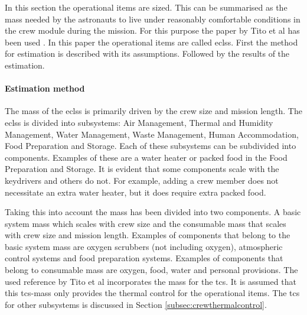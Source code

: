 In this section the operational items are sized. This can be summarised as the mass needed by the astronauts to live under reasonably comfortable conditions in the crew module during the mission. For this purpose the paper by Tito et al has been used \cite{Tito2013}. In this paper the operational items are called \acrfull{eclss}. First the method for estimation is described with its assumptions. Followed by the results of the estimation.

\paragraph{Estimation method}
The mass of the \gls{eclss} is primarily driven by the crew size and mission length. The \gls{eclss} is divided into subsystems: Air Management, Thermal and Humidity Management, Water Management, Waste Management, Human Accommodation, Food Preparation and Storage. Each of these subsystems can be subdivided into components. Examples of these are a water heater or packed food in the Food Preparation and Storage. It is evident that some components scale with the keydrivers and others do not. For example, adding a crew member does not necessitate an extra water heater, but it does require extra packed food. 


Taking this into account the mass has been divided into two components. A basic system mass which scales with crew size and the consumable mass that scales with crew size and mission length. Examples of components that belong to the basic system mass are oxygen scrubbers (not including oxygen), atmospheric control systems and food preparation systems. Examples of components that belong to consumable mass are oxygen, food, water and personal provisions. The used reference by Tito et al incorporates the mass for the \gls{tcs}. It is assumed that this \gls{tcs}-mass only provides the thermal control for the operational items. The \gls{tcs} for other subsystems is discussed in Section \ref{subsec:crewthermalcontrol}.

